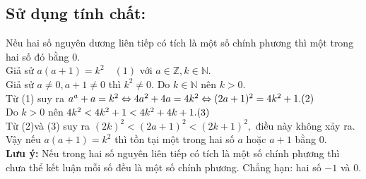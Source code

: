 \subsection{Sử dụng tính chất:} Nếu hai số nguyên dương liên tiếp có tích là một số chính phương thì một trong hai số đó bằng $0.$\\
Giả sử $a(a+1)=k^2\quad (1)$ với $a\in \mathbb{Z}, k\in\mathbb{N}.$\\
Giả sử $a\neq 0, a+1\neq 0$ thì $k^2\neq 0.$ Do $k\in \mathbb{N}$ nên $k>0.$\\
Từ (1) suy ra $a^a+a=k^2\Leftrightarrow 4a^2+4a=4k^2\Leftrightarrow (2a+1)^2=4k^2+1.\hfill (2)$\\
Do $k>0$ nên $4k^2<4k^2+1<4k^2+4k+1.\hfill (3)$\\
Từ (2)và (3) suy ra $(2k)^2<(2a+1)^2<(2k+1)^2,$ điều này không xảy ra.\\
Vậy nếu $a(a+1)=k^2$ thì tồn tại một trong hai số $a$ hoặc $a+1$ bằng $0.$\\
\textbf{Lưu ý:} Nếu trong hai số  nguyên liên tiếp có tích là một số chính phương thì chưa thể kết luận mỗi số đều là một số chính phương. Chẳng hạn: hai số $-1$ và $0.$

